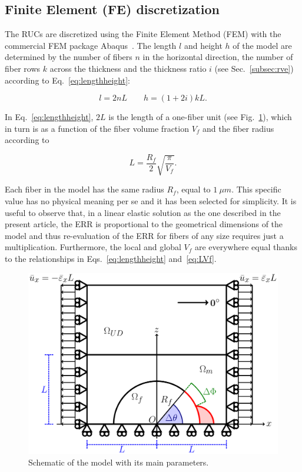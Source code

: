 \documentclass[review]{elsarticle}
\begin{document}

\subsection{Finite Element (FE) discretization}

The RUCs are discretized using the Finite Element Method (FEM) with the commercial FEM package Abaqus~\cite{abq12}. The length $l$ and height $h$ of the model are determined by the number of fibers $n$ in the horizontal direction, the number of fiber rows $k$ across the thickness and the thickness ratio $i$ (see Sec.~\ref{subsec:rve}) according to Eq.~\ref{eq:lengthheight}:

\begin{equation}\label{eq:lengthheight}
l=2nL\qquad h=\left(1+2i\right)kL.
\end{equation}

In Eq.~\ref{eq:lengthheight}, $2L$ is the length of a one-fiber unit (see Fig.~\ref{fig:modelschem}), which in turn is as a function of the fiber volume fraction $V_{f}$ and the fiber radius according to

\begin{equation}\label{eq:LVf}
L=\frac{R_{f}}{2}\sqrt{\frac{\pi}{V_{f}}}.
\end{equation}

Each fiber in the model has the same radius $R_{f}$, equal to $1\ \mu m$. This specific value has no physical meaning per se and it has been selected for simplicity. It is useful to observe that, in a linear elastic solution as the one described in the present article, the ERR is proportional to the geometrical dimensions of the model and thus re-evaluation of the ERR for fibers of any size requires just a multiplication. Furthermore, the local and global $V_{f}$ are everywhere equal thanks to the relationships in Eqs.~\ref{eq:lengthheight} and~\ref{eq:LVf}.

\begin{figure}[!h]
\centering
        \includegraphics[width=\textwidth]{RUC.pdf}
\caption{Schematic of the model with its main parameters.}\label{fig:modelschem}
\end{figure}
\end{document}
